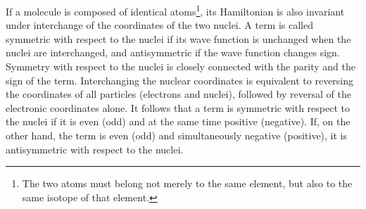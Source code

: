 If a molecule is composed of identical atoms\footnote{The two atoms must belong not merely to the same element, but also to the same isotope of that element.}, its Hamiltonian is also invariant under interchange of the coordinates of the two nuclei. A term is called symmetric with respect to the nuclei if its wave function is unchanged when the nuclei are interchanged, and antisymmetric if the wave function changes sign. Symmetry with respect to the nuclei is closely connected with the parity and the sign of the term. Interchanging the nuclear coordinates is equivalent to reversing the coordinates of all particles (electrons and nuclei), followed by reversal of the electronic coordinates alone. It follows that a term is symmetric with respect to the nuclei if it is even (odd) and at the same time positive (negative). If, on the other hand, the term is even (odd) and simultaneously negative (positive), it is antisymmetric with respect to the nuclei.
